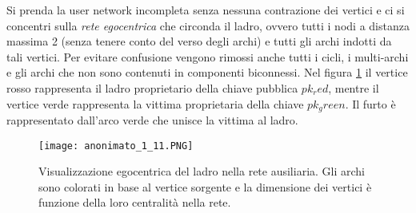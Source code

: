 Si prenda la user network incompleta senza nessuna contrazione dei vertici e ci si concentri sulla \emph{rete egocentrica} che circonda il ladro, ovvero tutti i nodi a distanza massima 2 (senza tenere conto del verso degli archi) e tutti gli archi indotti da tali vertici. Per evitare confusione vengono rimossi anche tutti i cicli, i multi-archi e gli archi che non sono contenuti in componenti biconnessi. Nel figura \ref{anonimato_1_11} il vertice rosso rappresenta il ladro proprietario della chiave pubblica $pk_red$, mentre il vertice verde rappresenta la vittima proprietaria della chiave $pk_green$. Il furto è rappresentato dall'arco verde che unisce la vittima al ladro.

\begin{figure}[htbp]
\centering
\texttt{[image: anonimato\_1\_11.PNG]}
\caption{Visualizzazione egocentrica del ladro nella rete ausiliaria. Gli archi sono colorati in base al vertice sorgente e la dimensione dei vertici è funzione della loro centralità nella rete.\label{anonimato_1_11}}
\end{figure}

